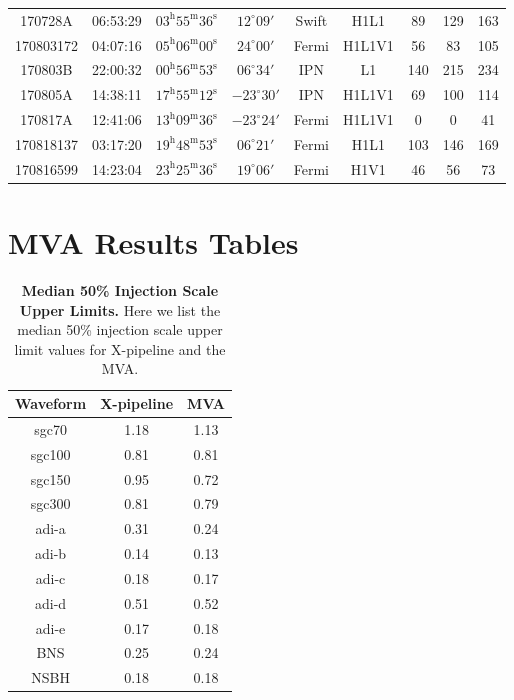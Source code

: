 \documentclass[11pt]{cuthesis}
\newcommand{\xp}{X-pipeline }
\begin{document}
\begin{landscape}
\begin{tabular}{ccccccccc}
170728A   & 06:53:29  & $03^{\mathrm{h}}55^{\mathrm{m}}36^{\mathrm{s}}$ & $12^{\circ}09'$ &  Swift   & H1L1   & 89  & 129 & 163 \\
170803172 & 04:07:16  & $05^{\mathrm{h}}06^{\mathrm{m}}00^{\mathrm{s}}$ & $24^{\circ}00'$ &  Fermi   & H1L1V1 & 56  & 83  & 105 \\
170803B   & 22:00:32  & $00^{\mathrm{h}}56^{\mathrm{m}}53^{\mathrm{s}}$ & $06^{\circ}34'$ &  IPN   & L1       & 140 & 215 & 234 \\
170805A   & 14:38:11  & $17^{\mathrm{h}}55^{\mathrm{m}}12^{\mathrm{s}}$ & $-23^{\circ}30'$ & IPN   & H1L1V1   & 69  & 100 & 114 \\
170817A   & 12:41:06  & $13^{\mathrm{h}}09^{\mathrm{m}}36^{\mathrm{s}}$ & $-23^{\circ}24'$ & Fermi   & H1L1V1 & 0   & 0   & 41 \\
170818137 & 03:17:20  & $19^{\mathrm{h}}48^{\mathrm{m}}53^{\mathrm{s}}$ & $06^{\circ}21'$ &  Fermi   & H1L1   & 103 & 146 & 169 \\
170816599 & 14:23:04  & $23^{\mathrm{h}}25^{\mathrm{m}}36^{\mathrm{s}}$ & $19^{\circ}06'$ &  Fermi   & H1V1   & 46  & 56  & 73 \\ 
\end{tabular}
\end{landscape}


\newpage
\FloatBarrier
\chapter{MVA Results Tables} \label{appendix:mva tables}

\begin{table}[h]
\centering
\begin{tabular}{  c | c | c }
Waveform   & X-pipeline & MVA \\ \hline                                                       
sgc70   & 1.18 & 1.13 \\
sgc100 & 0.81 & 0.81 \\
sgc150 & 0.95 & 0.72 \\
sgc300 & 0.81 & 0.79 \\
adi-a     & 0.31 & 0.24 \\
adi-b     & 0.14 & 0.13 \\
adi-c     & 0.18 & 0.17 \\
adi-d     & 0.51 & 0.52 \\
adi-e     & 0.17 & 0.18 \\
BNS     & 0.25 & 0.24 \\
NSBH   & 0.18 & 0.18 
\end{tabular}
\caption{\textbf{Median 50\% Injection Scale Upper Limits.} Here we list the median 50\% injection scale upper limit values for \xp and the MVA. }
\end{table}
\end{document}
